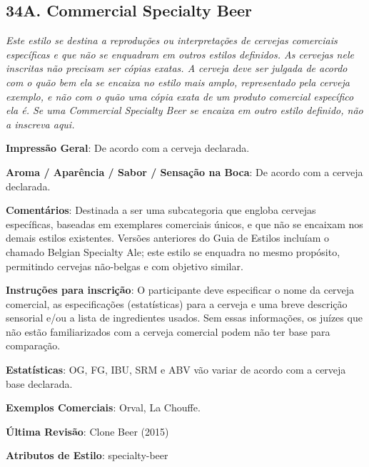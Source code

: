 \subsection*{34A. Commercial Specialty Beer}

\textit{Este estilo se destina a reproduções ou interpretações de cervejas comerciais específicas e que não se enquadram em outros estilos definidos. As cervejas nele inscritas não precisam ser cópias exatas. A cerveja deve ser julgada de acordo com o quão bem ela se encaixa no estilo mais amplo, representado pela cerveja exemplo, e não com o quão uma cópia exata de um produto comercial específico ela é. Se uma Commercial Specialty Beer se encaixa em outro estilo definido, não a inscreva aqui.}

\textbf{Impressão Geral}: De acordo com a cerveja declarada.

\textbf{Aroma / Aparência / Sabor / Sensação na Boca}: De acordo com a cerveja declarada.

\textbf{Comentários}: Destinada a ser uma subcategoria que engloba cervejas específicas, baseadas em exemplares comerciais únicos, e que não se encaixam nos demais estilos existentes. Versões anteriores do Guia de Estilos incluíam o chamado Belgian Specialty Ale; este estilo se enquadra no mesmo propósito, permitindo cervejas não-belgas e com objetivo similar.

\textbf{Instruções para inscrição}: O participante deve especificar o nome da cerveja comercial, as especificações (estatísticas) para a cerveja e uma breve descrição sensorial e/ou a lista de ingredientes usados. Sem essas informações, os juízes que não estão familiarizados com a cerveja comercial podem não ter base para comparação.

\textbf{Estatísticas}: OG, FG, IBU, SRM e ABV vão variar de acordo com a cerveja base declarada.

\textbf{Exemplos Comerciais}: Orval, La Chouffe.

\textbf{Última Revisão}: Clone Beer (2015)

\textbf{Atributos de Estilo}: specialty-beer


